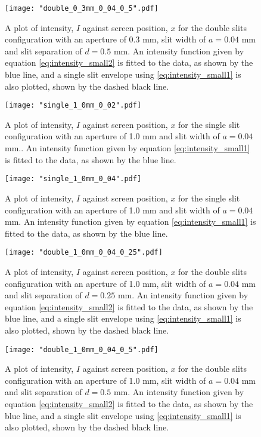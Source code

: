 \documentclass{article}
\begin{document}
\begin{figure}[h]
\centering
\texttt{[image: "double\_0\_3mm\_0\_04\_0\_5".pdf]}
\caption{A plot of intensity, $I$ against screen position, $x$ for the double slits configuration with an aperture of 0.3 mm, slit width of $ a = 0.04$ mm and slit separation of $d = 0.5$ mm. An intensity function given by equation \eqref{eq:intensity_small2} is fitted to the data, as shown by the blue line, and a single slit envelope using \eqref{eq:intensity_small1} is also plotted, shown by the dashed black line.}
\label{fig:double2}
\end{figure}

\begin{figure}[h]
\centering
\texttt{[image: "single\_1\_0mm\_0\_02".pdf]}
\caption{A plot of intensity, $I$ against screen position, $x$ for the single slit configuration with an aperture of 1.0 mm and slit width of $ a = 0.04$ mm.. An intensity function given by equation \eqref{eq:intensity_small1} is fitted to the data, as shown by the blue line.}
\label{fig:single3}
\end{figure}

\begin{figure}[h]
\centering
\texttt{[image: "single\_1\_0mm\_0\_04".pdf]}
\caption{A plot of intensity, $I$ against screen position, $x$ for the single slit configuration with an aperture of 1.0 mm and slit width of $a = 0.04$ mm. An intensity function given by equation \eqref{eq:intensity_small1} is fitted to the data, as shown by the blue line.}
\label{fig:single4}
\end{figure}

\begin{figure}[h]
\centering
\texttt{[image: "double\_1\_0mm\_0\_04\_0\_25".pdf]}
\caption{A plot of intensity, $I$ against screen position, $x$ for the double slits configuration with an aperture of 1.0 mm, slit width of $a = 0.04$ mm and slit separation of $d = 0.25$ mm. An intensity function given by equation \eqref{eq:intensity_small2} is fitted to the data, as shown by the blue line, and a single slit envelope using \eqref{eq:intensity_small1} is also plotted, shown by the dashed black line.}
\label{fig:double3}
\end{figure}

\begin{figure}[h]
\centering
\texttt{[image: "double\_1\_0mm\_0\_04\_0\_5".pdf]}
\caption{A plot of intensity, $I$ against screen position, $x$ for the double slits configuration with an aperture of 1.0 mm, slit width of $ a = 0.04$ mm and slit separation of $d = 0.5$ mm. An intensity function given by equation \eqref{eq:intensity_small2} is fitted to the data, as shown by the blue line, and a single slit envelope using \eqref{eq:intensity_small1} is also plotted, shown by the dashed black line.}
\label{fig:double4}
\end{figure}
\end{document}
